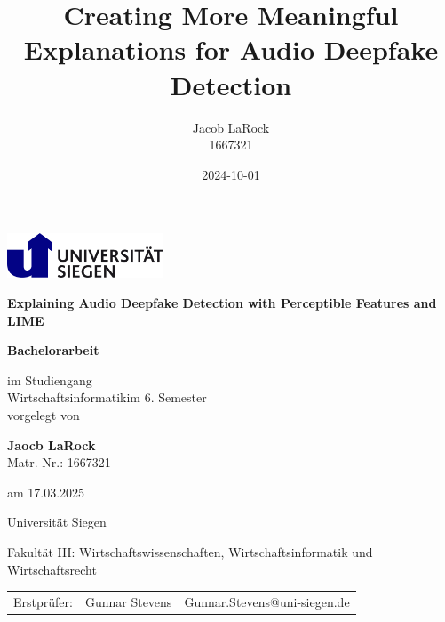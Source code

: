\documentclass{article}
\title{Creating More Meaningful Explanations for Audio Deepfake Detection}
\date{2024-10-01}
\author{Jacob LaRock\\1667321}
\makeatletter
\def\Institute{Universität Siegen}
\def\KindOfWork{Bachelorarbeit}
\def\Studiengang{Wirtschaftsinformatik}
\def\Fakultaet{Fakultät III: Wirtschaftswissenschaften, Wirtschaftsinformatik und Wirtschaftsrecht}
\def\Title{Explaining Audio Deepfake Detection with Perceptible Features and LIME}
\def\Subtitle{}
\def\student{Jaocb LaRock}
\def\studentno{1667321}
\def\Date{17.03.2025}
\def\semester{6}
\def\erstpruefer{Gunnar Stevens}
\def\erstprueferMail{Gunnar.Stevens@uni-siegen.de}
\makeatother
\begin{document}
	\begin{titlepage}
        \begin{minipage}{0.9\linewidth}
			\centering
			\includegraphics [width=0.35\textwidth]{images/LogoSiegen}
        \end{minipage}

		\vspace{2cm}

		\centering

		{\Large\bfseries \Title\par}
		{\large\bfseries \Subtitle\par}
		\vspace{2cm}

		{\large \textbf{\KindOfWork}\par}

		\vspace{1.5cm}

		{\normalsize im Studiengang \\
			\Studiengang  im \semester. Semester \\
		}
		\vspace{0.5cm}
		{\normalsize vorgelegt von}
		\vspace{0.5cm}

		{\normalsize \textbf{\student} \\
			Matr.-Nr.: \studentno  \\}
		{am \normalsize \Date\par}

		\vspace{0.5cm}

		{\Institute} \par
		{\Fakultaet}\par

		\vspace{1cm}

    {\begin{table}[h]
			\centering
			\begin{tabular}{lll}
				{Erstprüfer:} & \erstpruefer & \erstprueferMail \\
			\end{tabular}
		\end{table}}     
		\vfill
	\end{titlepage}
    \newpage
\end{document}
